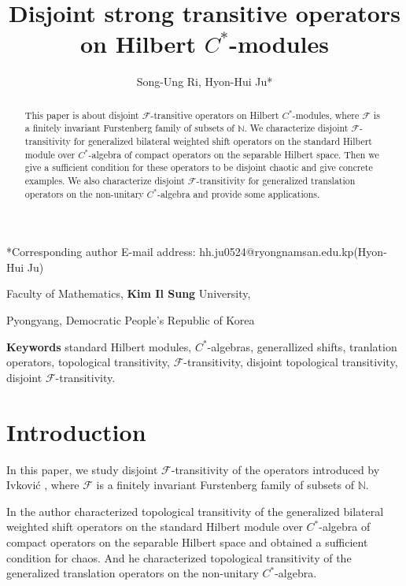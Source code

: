 \documentclass{article}
\title{Disjoint strong transitive operators on Hilbert $C^{\ast}$-modules}
\author{Song-Ung Ri, Hyon-Hui Ju*}
\date{}
\begin{document}
\maketitle
{\makeatletter\renewcommand*\@makefnmark{}\footnotetext

{*Corresponding author E-mail address:
hh.ju0524@ryongnamsan.edu.kp(Hyon-Hui Ju) }\makeatother}
	
\centerline{Faculty of Mathematics, {\bf Kim Il Sung} University,}
	
\centerline{Pyongyang, Democratic People's Republic of Korea}
	
\begin{abstract}
This paper is about disjoint $\mathcal{F}$-transitive operators on Hilbert $C^{\ast}$-modules, where $\mathcal{F}$ is a finitely invariant Furstenberg family of subsets of $\mathbb{N}$.
We characterize disjoint $\mathcal{F}$-transitivity for generalized bilateral weighted shift operators on the standard Hilbert module over $C^{\ast}$-algebra of compact operators on the separable Hilbert space. Then we give a sufficient condition for these operators to be disjoint chaotic and give concrete examples. We also characterize disjoint $\mathcal{F}$-transitivity for generalized translation operators on the non-unitary $C^{\ast}$-algebra and provide some applications.		
\end{abstract}
	
\vskip0.6cm\noindent
{\bf Keywords} standard Hilbert modules, $C^{\ast}$-algebras, generallized shifts, tranlation operators, topological transitivity, $\mathcal{F}$-transitivity, disjoint topological transitivity, disjoint $\mathcal{F}$-transitivity.

\section{Introduction}
In this paper, we study disjoint $\mathcal{F}$-transitivity of the operators introduced by Ivkovi\'{c} \cite{I24}, where $\mathcal{F}$ is a finitely invariant Furstenberg family of subsets of $\mathbb{N}$.

In \cite{I24} the author characterized topological transitivity of the generalized bilateral weighted shift operators on the standard Hilbert module over $C^{\ast}$-algebra of compact operators on the separable Hilbert space and obtained a sufficient condition for chaos. And he characterized topological transitivity of the generalized translation operators on the non-unitary $C^{\ast}$-algebra.
\end{document}
